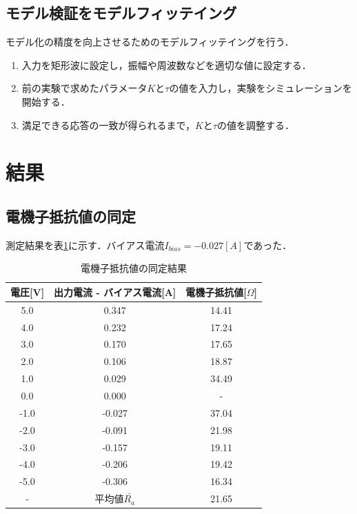 \documentclass[11pt,a4paper]{jsarticle}
\begin{document}
  \subsection{モデル検証をモデルフィッテイング}
  モデル化の精度を向上させるためのモデルフィッテイングを行う．
  \begin{enumerate}
   \item 入力を矩形波に設定し，振幅や周波数などを適切な値に設定する．
   \item 前の実験で求めたパラメータ$K$と$\tau$の値を入力し，実験をシミュレーションを開始する．
   \item 満足できる応答の一致が得られるまで，$K$と$\tau$の値を調整する．
  \end{enumerate}
 \section{結果}
  \subsection{電機子抵抗値の同定}
  測定結果を表\ref{table1}に示す．バイアス電流$I_{bias} = -0.027[A]$であった．
  \begin{table}[hbp]
   \begin{center}
    \caption{電機子抵抗値の同定結果}
     \begin{tabular}{|c|c|c|} \hline
      電圧[V] & 出力電流 - バイアス電流[A] & 電機子抵抗値[$\Omega$] \\ \hline \hline
      5.0 & 0.347 & 14.41 \\ \hline
      4.0 & 0.232 & 17.24 \\ \hline
      3.0 & 0.170 & 17.65 \\ \hline
      2.0 & 0.106 & 18.87 \\ \hline
      1.0 & 0.029 & 34.49 \\ \hline
      0.0 & 0.000 & - \\ \hline
      -1.0 & -0.027 & 37.04 \\ \hline
      -2.0 & -0.091 & 21.98 \\ \hline
      -3.0 & -0.157 & 19.11 \\ \hline
      -4.0 & -0.206 & 19.42 \\ \hline
      -5.0 & -0.306 & 16.34 \\ \hline
      - & 平均値$\bar{R_a}$ & 21.65 \\ \hline
     \end{tabular}
    \label{table1}
   \end{center}
  \end{table}
\end{document}
